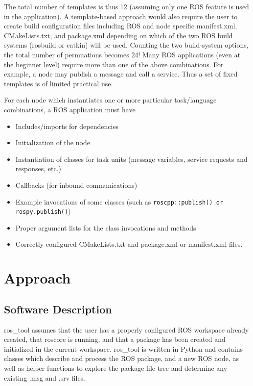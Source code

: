 \documentclass[letterpaper, 10 pt, conference]{ieeeconf}  %
\begin{document}
The total number of templates is thus 12 (assuming only one ROS feature is used in the application).  A template-based approach would also require the  user to create build configuration files including ROS and node specific manifest.xml, CMakeLists.txt, and package.xml depending on which of the two ROS build systems (rosbuild  or catkin) will be used.  Counting the two build-system options, the total number of permuations becomes 24!
Many ROS applications (even at the beginner level) require more than one of the above combinations.  For example, a node may publish a message and call a service.  Thus a set of fixed templates is of limited practical use. 
 
For each node which instantiates one or more particular task/language combinations, a ROS application must have
\begin{itemize}
  \item Includes/imports for dependencies
  \item Initialization of the node
  \item Instantiation of classes for task units (message variables, service requests and responses, etc.)
  \item Callbacks (for inbound communications)
  \item Example invocations of some classes (such as {\tt roscpp::publish() or rospy.publish()}) 
  \item Proper argument lists for the class invocations and methods
  \item Correctly configured CMakeLists.txt and package.xml or manifest.xml files. 
\end{itemize}


\section{Approach}
\subsection{Software Description}

ros\_tool assumes that the user has a properly configured ROS workspace already created, that roscore is running, and that a package has been created and initialized in the current workspace.   ros\_tool is written in Python and contains classes which describe and process the ROS package, and a new ROS node, as well as helper functions to explore the package file tree and determine any existing .msg and .srv files.  
\end{document}
